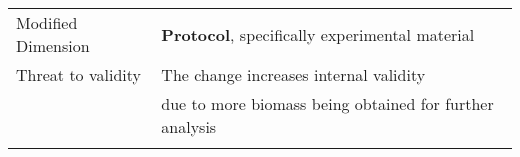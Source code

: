 \begin{table*}[h]
\begin{tabularx}{\textwidth}{
  >{\hsize=0.25\hsize}X
  >{\hsize=0.8\hsize}X}
     Modified Dimension & 
    \textbf{Protocol}, specifically experimental
    material \\   
    Threat to validity  & The change increases internal validity \\ & due to more biomass being obtained for further analysis\\    
	\noalign{\smallskip\smallskip}\hline
	\end{tabularx}  
\end{table*}
